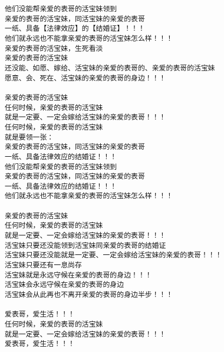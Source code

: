 \documentclass[9pt, b5paper]{article}
\begin{document}
\begin{verbatim}
他们没能帮亲爱的表哥的活宝妹领到
亲爱的表哥的活宝妹，同活宝妹的亲爱的表哥
一纸、具备【法律效应】的【结婚证】！！！
他们就永远也不能拿亲爱的表哥的活宝妹怎么样！！！
亲爱的表哥的活宝妹，生死看淡
亲爱的表哥的活宝妹
还没能、如愿、嫁给、活宝妹的亲爱的表哥的、亲爱的表哥的活宝妹
愿意、会、死在、活宝妹的亲爱的表哥的身边！！！

亲爱的表哥的活宝妹
任何时候，亲爱的表哥的活宝妹
就是一定要、一定会嫁给活宝妹的亲爱的表哥！！！
任何时候，亲爱的表哥的活宝妹
就是要领一张：
亲爱的表哥的活宝妹，同活宝妹的亲爱的表哥
一纸、具备法律效应的结婚证！！！
他们没能帮亲爱的表哥的活宝妹领到
亲爱的表哥的活宝妹，同活宝妹的亲爱的表哥
一纸、具备法律效应的结婚证！！！
他们就永远也不能拿亲爱的表哥的活宝妹怎么样！！！

亲爱的表哥的活宝妹
任何时候，亲爱的表哥的活宝妹
就是一定要、一定会嫁给活宝妹的亲爱的表哥！！！
活宝妹只要还没能领到活宝妹同亲爱的表哥的结婚证
活宝妹只要还没能就是一定要、一定会嫁给活宝妹的亲爱的表哥！！！
活宝妹只要还有一息尚存
活宝妹就是永远守候在亲爱的表哥的身边！！！
活宝妹会永远守候在亲爱的表哥的身边
活宝妹会从此再也不离开亲爱的表哥的身边半步！！！

爱表哥，爱生活！！！
任何时候，亲爱的表哥的活宝妹
就是一定要、一定会嫁给活宝妹的亲爱的表哥！！！
爱表哥，爱生活！！！
\end{verbatim}
\end{document}
